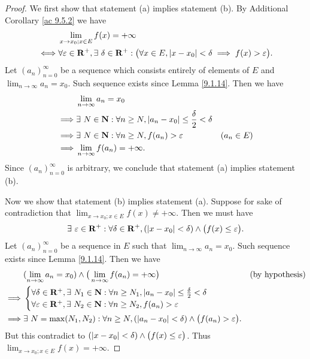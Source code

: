\begin{proof}
    We first show that statement (a) implies statement (b).
    By Additional Corollary \ref{ac 9.5.2} we have
    \begin{align*}
             & \lim_{x \to x_0 ; x \in E} f(x) = +\infty                                                                                               \\
        \iff & \forall \varepsilon \in \mathbf{R}^+, \exists\ \delta \in \mathbf{R}^+ : \big(\forall x \in E, \left\lvert x - x_0\right\rvert < \delta \implies f(x) > \varepsilon\big).
    \end{align*}
    Let \((a_n)_{n = 0}^\infty\) be a sequence which consists entirely of elements of \(E\) and \(\lim_{n \to \infty} a_n = x_0\).
    Such sequence exists since Lemma \ref{9.1.14}.
    Then we have
    \begin{align*}
                 & \lim_{n \to \infty} a_n = x_0                                                                      \\
        \implies & \exists\ N \in \mathbf{N} : \forall n \geq N, \left\lvert a_n - x_0\right\rvert \leq \frac{\delta}{2} < \delta               \\
        \implies & \exists\ N \in \mathbf{N} : \forall n \geq N, f(a_n) > \varepsilon                           & (a_n \in E) \\
        \implies & \lim_{n \to \infty} f(a_n) = +\infty.
    \end{align*}
    Since \((a_n)_{n = 0}^\infty\) is arbitrary, we conclude that statement (a) implies statement (b).

    Now we show that statement (b) implies statement (a).
    Suppose for sake of contradiction that \(\lim_{x \to x_0 ; x \in E} f(x) \neq +\infty\).
    Then we must have
    \[
        \exists\ \varepsilon \in \mathbf{R}^+ : \forall \delta \in \mathbf{R}^+, (\left\lvert x - x_0\right\rvert < \delta) \land \big(f(x) \leq \varepsilon\big).
    \]
    Let \((a_n)_{n = 0}^\infty\) be a sequence in \(E\) such that \(\lim_{n \to \infty} a_n = x_0\).
    Such sequence exists since Lemma \ref{9.1.14}.
    Then we have
    \begin{align*}
                 & (\lim_{n \to \infty} a_n = x_0) \land \big(\lim_{n \to \infty} f(a_n) = +\infty\big)                                 & \text{(by hypothesis)} \\
        \implies & \begin{cases}
                       \forall \delta \in \mathbf{R}^+, \exists\ N_1 \in \mathbf{N} : \forall n \geq N_1, \left\lvert a_n - x_0\right\rvert \leq \frac{\delta}{2} < \delta \\
                       \forall \varepsilon \in \mathbf{R}^+, \exists\ N_2 \in \mathbf{N} : \forall n \geq N_2, f(a_n) > \varepsilon
                   \end{cases}                             \\
        \implies & \exists\ N = \max(N_1, N_2) : \forall n \geq N, (\left\lvert a_n - x_0\right\rvert < \delta) \land \big(f(a_n) > \varepsilon\big).
    \end{align*}
    But this contradict to \((\left\lvert x - x_0\right\rvert < \delta) \land \big(f(x) \leq \varepsilon\big)\).
    Thus \(\lim_{x \to x_0 ; x \in E} f(x) = +\infty\).
\end{proof}

